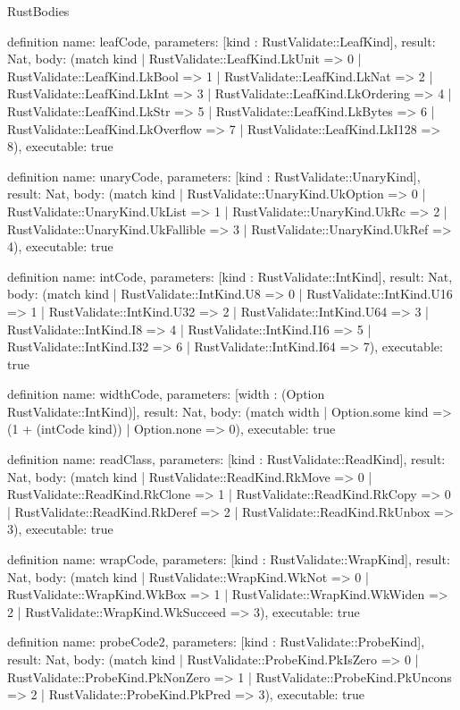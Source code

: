 \begin{lexlean}{RustBodies}
\begin{semanticmodule}
definition{
  name: leafCode,
  parameters: [kind : RustValidate::LeafKind],
  result: Nat,
  body: (match kind
    | RustValidate::LeafKind.LkUnit => 0
    | RustValidate::LeafKind.LkBool => 1
    | RustValidate::LeafKind.LkNat => 2
    | RustValidate::LeafKind.LkInt => 3
    | RustValidate::LeafKind.LkOrdering => 4
    | RustValidate::LeafKind.LkStr => 5
    | RustValidate::LeafKind.LkBytes => 6
    | RustValidate::LeafKind.LkOverflow => 7
    | RustValidate::LeafKind.LkI128 => 8),
  executable: true
}

definition{
  name: unaryCode,
  parameters: [kind : RustValidate::UnaryKind],
  result: Nat,
  body: (match kind
    | RustValidate::UnaryKind.UkOption => 0
    | RustValidate::UnaryKind.UkList => 1
    | RustValidate::UnaryKind.UkRc => 2
    | RustValidate::UnaryKind.UkFallible => 3
    | RustValidate::UnaryKind.UkRef => 4),
  executable: true
}

definition{
  name: intCode,
  parameters: [kind : RustValidate::IntKind],
  result: Nat,
  body: (match kind
    | RustValidate::IntKind.U8 => 0
    | RustValidate::IntKind.U16 => 1
    | RustValidate::IntKind.U32 => 2
    | RustValidate::IntKind.U64 => 3
    | RustValidate::IntKind.I8 => 4
    | RustValidate::IntKind.I16 => 5
    | RustValidate::IntKind.I32 => 6
    | RustValidate::IntKind.I64 => 7),
  executable: true
}

definition{
  name: widthCode,
  parameters: [width : (Option RustValidate::IntKind)],
  result: Nat,
  body: (match width | Option.some kind => (1 + (intCode kind)) | Option.none => 0),
  executable: true
}

definition{
  name: readClass,
  parameters: [kind : RustValidate::ReadKind],
  result: Nat,
  body: (match kind
    | RustValidate::ReadKind.RkMove => 0
    | RustValidate::ReadKind.RkClone => 1
    | RustValidate::ReadKind.RkCopy => 0
    | RustValidate::ReadKind.RkDeref => 2
    | RustValidate::ReadKind.RkUnbox => 3),
  executable: true
}

definition{
  name: wrapCode,
  parameters: [kind : RustValidate::WrapKind],
  result: Nat,
  body: (match kind
    | RustValidate::WrapKind.WkNot => 0
    | RustValidate::WrapKind.WkBox => 1
    | RustValidate::WrapKind.WkWiden => 2
    | RustValidate::WrapKind.WkSucceed => 3),
  executable: true
}

definition{
  name: probeCode2,
  parameters: [kind : RustValidate::ProbeKind],
  result: Nat,
  body: (match kind
    | RustValidate::ProbeKind.PkIsZero => 0
    | RustValidate::ProbeKind.PkNonZero => 1
    | RustValidate::ProbeKind.PkUncons => 2
    | RustValidate::ProbeKind.PkPred => 3),
  executable: true
}


\end{semanticmodule}
\end{lexlean}
